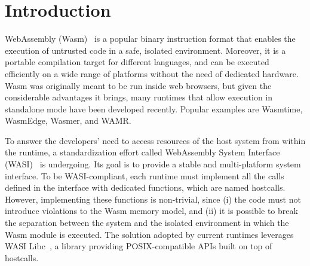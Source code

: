 \section{Introduction}\label{intro}

WebAssembly (Wasm)~\cite{haas2017bringing} is a popular binary
instruction format that enables the execution of untrusted code in a
safe, isolated environment. Moreover, it is a portable compilation
target for different languages, and can be executed efficiently on a
wide range of platforms without the need of dedicated hardware. Wasm
was originally meant to be run inside web browsers, but given the
considerable advantages it brings, many runtimes that allow
execution in standalone mode have been developed recently. Popular
examples are Wasmtime, WasmEdge, Wasmer, and WAMR.

To answer the developers' need to access resources of the host
system from within the runtime, a standardization effort called
WebAssembly System Interface (WASI)~\cite{wasi} is undergoing.
Its goal is to provide a stable and multi-platform system interface. To be WASI-compliant, each runtime must implement
all the calls defined in the interface with dedicated functions, which
are named hostcalls. However, implementing these functions is
non-trivial, since (i) the code must not introduce violations to the
Wasm memory model, and (ii) it is possible to break the separation
between the system and the isolated environment in which the Wasm module is
executed. The solution adopted by current runtimes leverages
WASI Libc~\cite{wasi-libc}, a library providing POSIX-compatible APIs
built on top of hostcalls.

